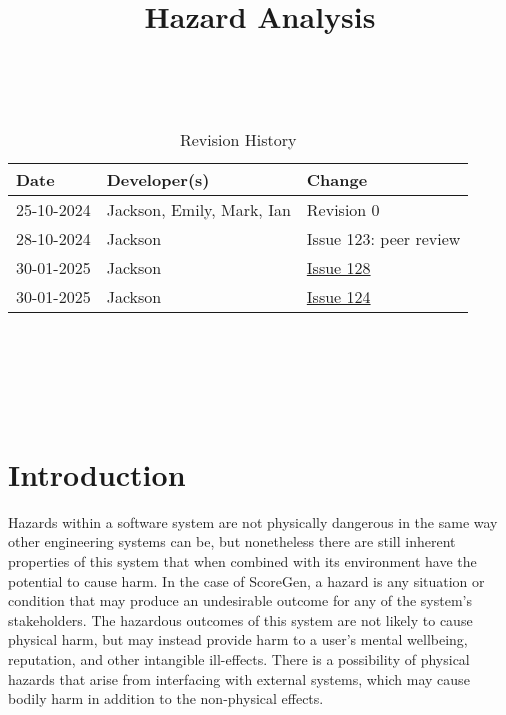 \documentclass{article}
\title{Hazard Analysis\\\progname}
\author{\authname}
\date{}
\begin{document}
\maketitle
\thispagestyle{empty}

~\newpage


\begin{table}[hp]
\caption{Revision History} \label{TblRevisionHistory}
\begin{tabularx}{\textwidth}{llX}
\toprule
\textbf{Date} & \textbf{Developer(s)} & \textbf{Change}\\
\midrule
25-10-2024 & Jackson, Emily, Mark, Ian & Revision 0\\
28-10-2024 & Jackson & Issue 123: peer review\\
30-01-2025 & Jackson & \href{https://github.com/emilyperica/ScoreGen/issues/128}{Issue 128}\\
30-01-2025 & Jackson & \href{https://github.com/emilyperica/ScoreGen/issues/124}{Issue 124}\\
\bottomrule
\end{tabularx}
\end{table}

~\newpage

\tableofcontents

~\newpage

\listoftables

~\newpage


\section{Introduction}

Hazards within a software system are not physically dangerous in the same way other engineering systems can be, 
but nonetheless there are still inherent properties of this system that when combined with its environment have 
the potential to cause harm. In the case of ScoreGen, a hazard is any situation or condition that may produce an 
undesirable outcome for any of the system’s stakeholders. The hazardous outcomes of this system are not likely to 
cause physical harm, but may instead provide harm to a user’s mental wellbeing, reputation, and other intangible 
ill-effects. There is a possibility of physical hazards that arise from interfacing with external systems, which 
may cause bodily harm in addition to the non-physical effects.
\end{document}
